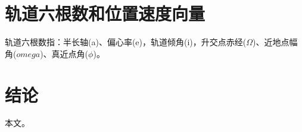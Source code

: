 \section{轨道六根数和位置速度向量}
轨道六根数指：半长轴(a)、偏心率(e)，轨道倾角(i)，升交点赤经($\Omega$)、近地点幅角($omega$)、真近点角($\phi$)。

\section{结\quad 论}
本文。




